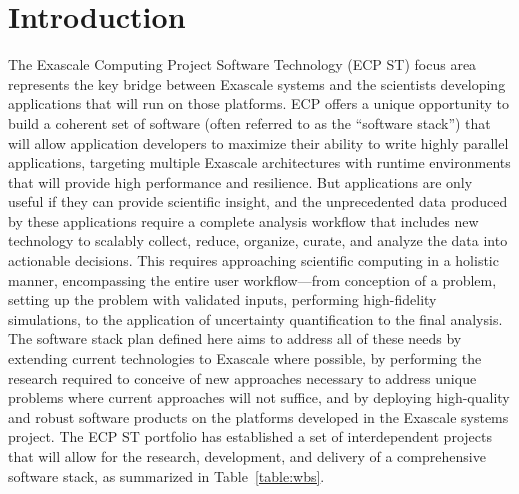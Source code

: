 \section{Introduction}\label{sect:intro}
The Exascale Computing Project Software Technology (ECP ST) focus area represents the key bridge between Exascale systems and the scientists developing applications that will run on those platforms. ECP offers a unique opportunity to build a coherent set of software (often referred to as the ``software stack'') that will allow application developers to maximize their ability to write highly parallel applications, targeting multiple Exascale architectures with runtime environments that will provide high performance and resilience. But applications are only useful if they can provide scientific insight, and the unprecedented data produced by these applications require a complete analysis workflow that includes new technology to scalably collect, reduce, organize, curate, and analyze the data into actionable decisions. This requires approaching scientific computing in a holistic manner, encompassing the entire user workflow—from conception of a problem, setting up the problem with validated inputs, performing high-fidelity simulations, to the application of uncertainty quantification to the final analysis. The software stack plan defined here aims to address all of these needs by extending current technologies to Exascale where possible, by performing the research required to conceive of new approaches necessary to address unique problems where current approaches will not suffice, and by deploying high-quality and robust software products on the platforms developed in the Exascale systems project.
The ECP ST portfolio has established a set of interdependent projects that will allow for the research, development, and delivery of a comprehensive software stack, as summarized in Table~\ref{table:wbs}.

